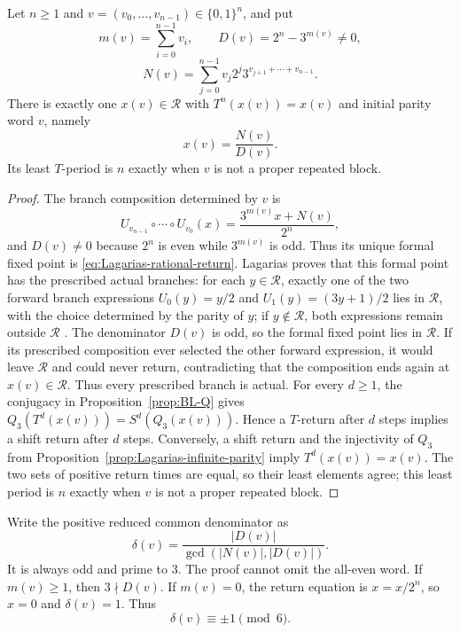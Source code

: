 \begin{theorem}
\label{thm:Lagarias-rational-return}
Let $n\geq1$ and $v=(v_0,\ldots,v_{n-1})\in\{0,1\}^n$, and put
\[
 m(v)=\sum_{i=0}^{n-1}v_i,
 \qquad
 D(v)=2^n-3^{m(v)}\neq0,
\]
\[
 N(v)=\sum_{j=0}^{n-1}
 v_j2^j3^{v_{j+1}+\cdots+v_{n-1}}.
\]
There is exactly one $x(v)\in\mathcal R$ with
$T^n(x(v))=x(v)$ and initial parity word $v$, namely
\begin{equation}
\label{eq:Lagarias-rational-return}
 x(v)=\frac{N(v)}{D(v)}.
\end{equation}
Its least $T$-period is $n$ exactly when $v$ is not a proper repeated block.
\end{theorem}

\begin{proof}
The branch composition determined by $v$ is
\[
 U_{v_{n-1}}\circ\cdots\circ U_{v_0}(x)
 =\frac{3^{m(v)}x+N(v)}{2^n},
\]
and $D(v)\neq0$ because $2^n$ is even while $3^{m(v)}$ is odd.  Thus its
unique formal fixed point is
\eqref{eq:Lagarias-rational-return}.  Lagarias proves that this formal point
has the prescribed actual branches: for each $y\in\mathcal R$, exactly one of
the two forward branch expressions $U_0(y)=y/2$ and
$U_1(y)=(3y+1)/2$ lies in $\mathcal R$, with the choice determined by the
parity of $y$; if $y\notin\mathcal R$, both expressions remain outside
$\mathcal R$ \cite[pp.~36--37, Thm.~2.1]{Lagarias1990}.  The denominator
$D(v)$ is odd, so the formal fixed point lies in $\mathcal R$.  If its
prescribed composition ever selected the other forward expression, it would
leave $\mathcal R$ and could never return, contradicting that the composition
ends again at $x(v)\in\mathcal R$.  Thus every prescribed branch is actual.
For every $d\geq1$, the conjugacy in
Proposition~\ref{prop:BL-Q} gives
$Q_3(T^d(x(v)))=S^d(Q_3(x(v)))$.  Hence a $T$-return after $d$ steps implies
a shift return after $d$ steps.  Conversely, a shift return and the
injectivity of $Q_3$ from Proposition~\ref{prop:Lagarias-infinite-parity}
imply $T^d(x(v))=x(v)$.  The two sets of positive return times are equal, so
their least elements agree; this least period is $n$ exactly when $v$ is not
a proper repeated block.
\end{proof}

Write the positive reduced common denominator as
\begin{equation}
\label{eq:Lagarias-reduced-denominator}
 \delta(v)=\frac{|D(v)|}{\gcd(|N(v)|,|D(v)|)}.
\end{equation}
It is always odd and prime to $3$.  The proof cannot omit the all-even word.
If $m(v)\geq1$, then $3\nmid D(v)$.  If $m(v)=0$, the return equation is
$x=x/2^n$, so $x=0$ and $\delta(v)=1$.  Thus
\begin{equation}
\label{eq:Lagarias-denominator-mod-six}
 \delta(v)\equiv\pm1\pmod6.
\end{equation}

